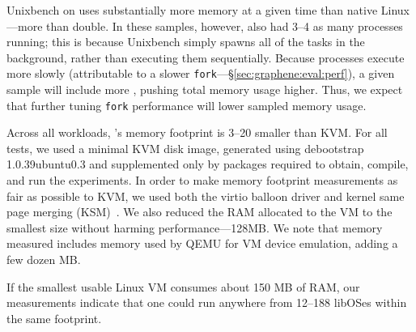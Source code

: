 Unixbench on \graphene{} uses substantially more memory at a given time than native Linux---more than double.
In these samples, however, \graphene{} also had 3--4\x{} as many processes
running; this is because Unixbench simply spawns all of the tasks in the background, rather than
executing them sequentially.   Because \graphene{} processes execute more slowly (attributable to a slower {\tt fork}---\S\ref{sec:graphene:eval:perf}),
a given sample will include more \picoprocs{}, pushing total memory usage higher.
Thus, we expect that further tuning {\tt fork} performance will lower sampled memory usage.


Across all workloads, \graphene{}'s memory footprint is 3--20\x{}  
smaller than KVM.  
For all tests, we used a minimal KVM disk image, 
generated using debootstrap 1.0.39ubuntu0.3 and supplemented only by packages required to obtain, compile, and run the experiments.
In order to make memory footprint measurements as fair as possible to KVM, 
we used both the virtio balloon driver and kernel same page merging (KSM)~\citep{ksm}.
We also reduced the RAM allocated to the VM to the smallest size without harming performance---128MB.  We note that memory measured includes memory used by QEMU for VM device emulation, 
adding a few dozen MB.

If the smallest usable Linux VM consumes about 150 MB of RAM, our measurements indicate that 
one could run anywhere from 12--188 libOSes within the same footprint.



